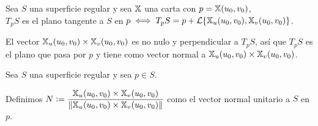 \begin{defn}
	Sea $S$ una superficie regular y sea $\mathbb{X}$ una carta con $p = \mathbb{X}(u_0, v_0)$, \\$T_pS$ es el plano tangente a $S$ en $\displaystyle p \iff T_pS = p + \mathcal{L}\{\mathbb{X}_u(u_0, v_0), \mathbb{X}_v(u_0, v_0)\}$.
\end{defn}


El vector $\mathbb{X}_u(u_0, v_0) \times \mathbb{X}_v(u_0, v_0)$ es no nulo y perpendicular a $T_pS$, así que $T_pS$ es el plano que pasa por $p$ y tiene como vector normal a $\mathbb{X}_u(u_0, v_0) \times \mathbb{X}_v(u_0, v_0)$.

\begin{defn}
	Sea $S$ una superficie regular y sea $p \in S$.

	Definimos $\displaystyle N\vcentcolon= \frac{\mathbb{X}_u(u_0, v_0) \times \mathbb{X}_v(u_0, v_0)}{\left\Vert\mathbb{X}_u(u_0, v_0) \times \mathbb{X}_v(u_0, v_0)\right\Vert}$ como el vector normal unitario a $S$ en $p$.
\end{defn}
